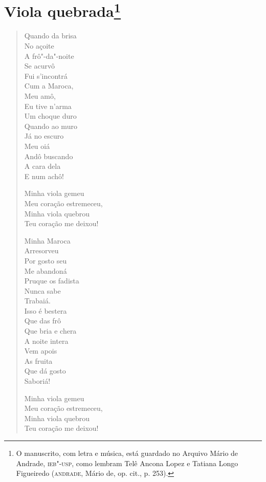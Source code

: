 {\chapter{Viola quebrada\footnote[*]{O manuscrito, com letra e música, está
  guardado no Arquivo Mário de Andrade, \textsc{ieb"-usp}, como lembram Telê
  Ancona Lopez e Tatiana Longo Figueiredo (\textsc{andrade}, Mário de, op. cit.,
  p. 253).}}

\begin{verse}
Quando da brisa\\
No açoite\\
A frô"-da"-noite\\
Se acurvô\\
Fui s'incontrá\\
Cum a Maroca,\\
Meu amô,\\
Eu tive n'arma\\
Um choque duro\\
Quando ao muro\\
Já no escuro\\
Meu oiá\\
Andô buscando\\
A cara dela\\
E num achô!

Minha viola gemeu\\
Meu coração estremeceu,\\
Minha viola quebrou\\
Teu coração me deixou!

Minha Maroca\\
Arresorveu\\
Por gosto seu\\
Me abandoná\\
Pruque os fadista\\
Nunca sabe\\
Trabaiá.\\
Isso é bestera\\
Que das frô\\
Que bria e chera\\
A noite intera\\
Vem apois\\
As fruita\\
Que dá gosto\\
Saboriá!

Minha viola gemeu\\
Meu coração estremeceu,\\
Minha viola quebrou\\
Teu coração me deixou!


\end{verse}}

